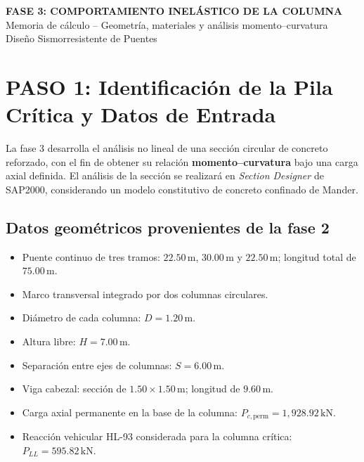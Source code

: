 \documentclass[11pt,a4paper]{article}
\begin{document}
\begin{center}
{\large\bfseries FASE 3: COMPORTAMIENTO INELÁSTICO DE LA COLUMNA}\\[3pt]
{\normalsize Memoria de cálculo -- Geometría, materiales y análisis momento--curvatura}\\[2pt]
{\small Diseño Sismorresistente de Puentes}
\end{center}
\vspace{2mm}

\section{PASO 1: Identificación de la Pila Crítica y Datos de Entrada}

La fase 3 desarrolla el análisis no lineal de una sección circular de concreto
reforzado, con el fin de obtener su relación \textbf{momento--curvatura} bajo
una carga axial definida. El análisis de la sección se realizará en
\textit{Section Designer} de SAP2000, considerando un modelo constitutivo
de concreto confinado de Mander.

\subsection*{Datos geométricos provenientes de la fase 2}
\begin{itemize}
  \item Puente continuo de tres tramos: $22.50\,\mathrm{m}$, $30.00\,\mathrm{m}$ y $22.50\,\mathrm{m}$; longitud total de $75.00\,\mathrm{m}$.
  \item Marco transversal integrado por dos columnas circulares.
  \item Diámetro de cada columna: $D=1.20\,\mathrm{m}$.
  \item Altura libre: $H=7.00\,\mathrm{m}$.
  \item Separación entre ejes de columnas: $S=6.00\,\mathrm{m}$.
  \item Viga cabezal: sección de $1.50\times 1.50\,\mathrm{m}$; longitud de $9.60\,\mathrm{m}$.
  \item Carga axial permanente en la base de la columna: $P_{c,\mathrm{perm}}=1{,}928.92\,\mathrm{kN}$.
  \item Reacción vehicular HL-93 considerada para la columna crítica: $P_{LL}=595.82\,\mathrm{kN}$.
\end{itemize}
\end{document}
